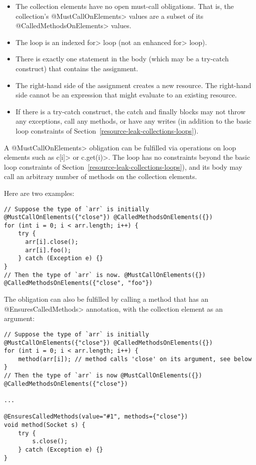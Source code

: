\begin{itemize}
  \item The collection elements have no open must-call obligations.  That
  is, the collection's \<@MustCallOnElements> values are a subset of its
  \<@CalledMethodsOnElements> values.
  \item The loop is an indexed \<for> loop (not an enhanced \<for> loop).
  \item There is exactly one statement in the body (which may be a try-catch construct) that contains the assignment.
  \item The right-hand side of the assignment creates a new resource.
    The right-hand side cannot be an expression that might evaluate to an existing resource.
  \item If there is a try-catch construct, the catch and finally blocks may
  not throw any exceptions, call any methods, or have any writes (in
  addition to the basic loop constraints of Section~\ref{resource-leak-collections-loops}).
\end{itemize}



A \<@MustCallOnElements> obligation can be fulfilled via operations on loop
elements such as \<c[i]> or \<c.get(i)>.
The loop has no constraints beyond the basic loop constraints of
Section~\ref{resource-leak-collections-loops}), and its body may call an
arbitrary number of methods on the collection elements.

Here are two examples:

\begin{verbatim}
// Suppose the type of `arr` is initially @MustCallOnElements({"close"}) @CalledMethodsOnElements({})
for (int i = 0; i < arr.length; i++) {
    try {
      arr[i].close();
      arr[i].foo();
    } catch (Exception e) {}
}
// Then the type of `arr` is now. @MustCallOnElements({}) @CalledMethodsOnElements({"close", "foo"})
\end{verbatim}

The obligation can also be fulfilled by calling a method that has an \<@EnsuresCalledMethods> annotation, with the collection element as an argument:
\begin{verbatim}
// Suppose the type of `arr` is initially @MustCallOnElements({"close"}) @CalledMethodsOnElements({})
for (int i = 0; i < arr.length; i++) {
    method(arr[i]); // method calls 'close' on its argument, see below
}
// Then the type of `arr` is now @MustCallOnElements({}) @CalledMethodsOnElements({"close"})

...

@EnsuresCalledMethods(value="#1", methods={"close"})
void method(Socket s) {
    try {
        s.close();
    } catch (Exception e) {}
}
\end{verbatim}

